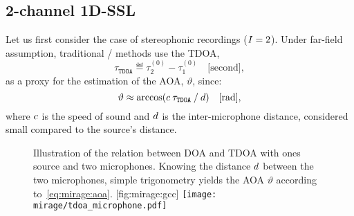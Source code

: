 \subsection{2-channel 1D-SSL}\label{subsec:mirage:1D-SSL}
\newcommand{\tdoa}{\ensuremath{\tau_\mathtt{TDOA}}}
\newcommand{\aoa}{\ensuremath{\vartheta}}
Let us first consider the case of stereophonic recordings ($I=2$).
Under far-field assumption, traditional \SSL/ methods use the \acf{TDOA},
\begin{equation*}
    \tdoa \eqdef \tau^{(0)}_2 - \tau^{(0)}_1\quad\text{[second]}
    ,
\end{equation*}
as a proxy for the estimation of the \ac{AOA}, $\aoa$, since:
\begin{equation}\label{eq:mirage:aoa}
    \vartheta \approx \arccos \kparen{\speedOfSound \: \tdoa \: / \: \distMicMic }\quad\text{[rad]},
\end{equation}
where $c$ is the speed of sound and $d$ is the inter-microphone distance, considered small compared to the source's distance.

\begin{figure}
    \begin{sidecaption}[]{
        Illustration of the relation between \ac{DOA} and \ac{TDOA} with ones source and two microphones.
        Knowing the distance $d$ between the two microphones, simple trigonometry yields the \ac{AOA} $\vartheta$ according to~\cref{eq:mirage:aoa}.
    }[fig:mirage:gcc]
        \texttt{[image: mirage/tdoa\_microphone.pdf]}
    \end{sidecaption}
\end{figure}


